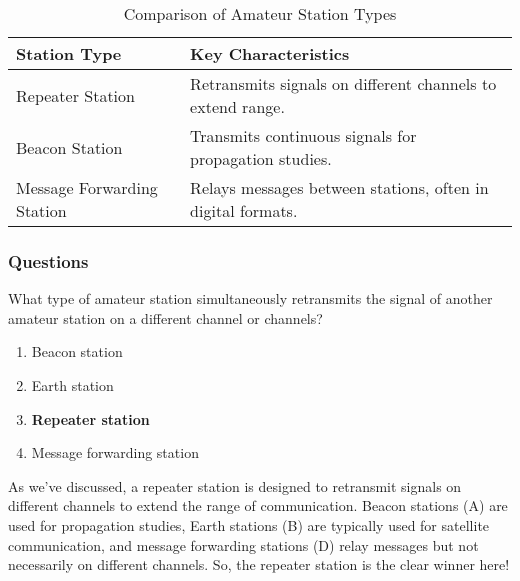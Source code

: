 \begin{table}[h]
    \centering
    \begin{tabular}{|l|l|}
        \hline
        \textbf{Station Type} & \textbf{Key Characteristics} \\
        \hline
        Repeater Station & Retransmits signals on different channels to extend range. \\
        Beacon Station & Transmits continuous signals for propagation studies. \\
        Message Forwarding Station & Relays messages between stations, often in digital formats. \\
        \hline
    \end{tabular}
    \caption{Comparison of Amateur Station Types}
    \label{tab:station-comparison}
\end{table}

\subsubsection{Questions}

\begin{tcolorbox}[colback=gray!10!white,colframe=black!75!black,title={T1F09}]
    What type of amateur station simultaneously retransmits the signal of another amateur station on a different channel or channels?
    \begin{enumerate}[label=\Alph*),noitemsep]
        \item Beacon station
        \item Earth station
        \item \textbf{Repeater station}
        \item Message forwarding station
    \end{enumerate}
\end{tcolorbox}

As we’ve discussed, a repeater station is designed to retransmit signals on different channels to extend the range of communication. Beacon stations (A) are used for propagation studies, Earth stations (B) are typically used for satellite communication, and message forwarding stations (D) relay messages but not necessarily on different channels. So, the repeater station is the clear winner here!

